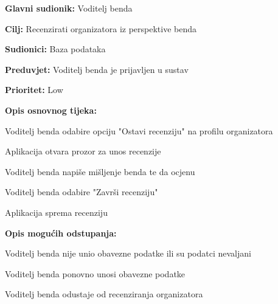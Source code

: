 \noindent {}
	\begin{packed_item}
		
		\item \textbf{Glavni sudionik: } Voditelj benda  
		\item \textbf{Cilj:} Recenzirati organizatora iz perspektive benda
		\item \textbf{Sudionici:} Baza podataka
		\item \textbf{Preduvjet:} Voditelj benda je prijavljen u sustav
		\item \textbf{Prioritet:} Low
		\item \textbf{Opis osnovnog tijeka:} 
		
		\item[] \begin{packed_enum}
			
			\item Voditelj benda odabire opciju "Ostavi recenziju" na profilu organizatora
			\item Aplikacija otvara prozor za unos recenzije
			\item Voditelj benda napiše mišljenje benda te da ocjenu
			\item Voditelj benda odabire "Završi recenziju"
			\item Aplikacija sprema recenziju 
		\end{packed_enum}
	
		\item  \textbf{Opis mogućih odstupanja:}
		\item[] \begin{packed_item}
		
			\item[4.a] Voditelj benda nije unio obavezne podatke ili su podatci nevaljani
			\item[] \begin{packed_enum}
				\item Voditelj benda ponovno unosi obavezne podatke
				\item Voditelj benda odustaje od recenziranja organizatora
			\end{packed_enum}	
		
		\end{packed_item}
	\end{packed_item}


